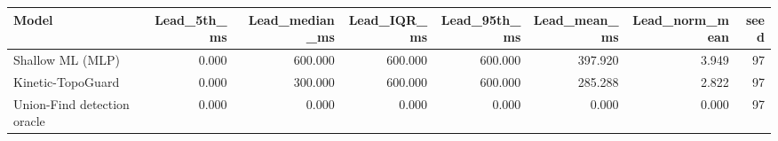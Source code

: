 \begin{tabular}{lrrrrrrr}
\toprule
Model & Lead\_5th\_ms & Lead\_median\_ms & Lead\_IQR\_ms & Lead\_95th\_ms & Lead\_mean\_ms & Lead\_norm\_mean & seed \\
\midrule
Shallow ML (MLP) & 0.000 & 600.000 & 600.000 & 600.000 & 397.920 & 3.949 & 97 \\
Kinetic-TopoGuard & 0.000 & 300.000 & 600.000 & 600.000 & 285.288 & 2.822 & 97 \\
Union-Find detection oracle & 0.000 & 0.000 & 0.000 & 0.000 & 0.000 & 0.000 & 97 \\
\bottomrule
\end{tabular}
